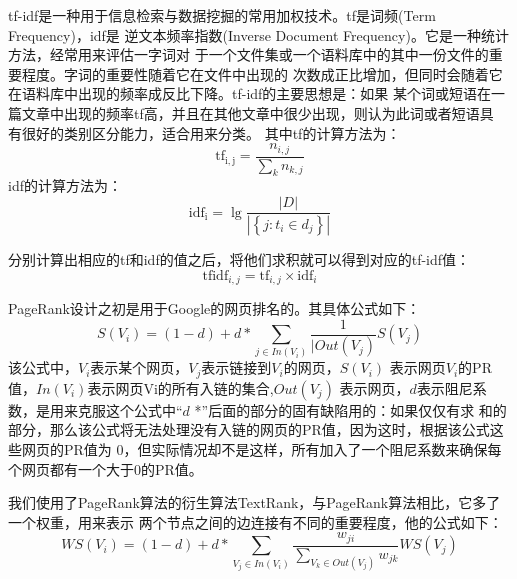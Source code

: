 tf-idf是一种用于信息检索与数据挖掘的常用加权技术。tf是词频(Term Frequency)，idf是
逆文本频率指数(Inverse Document Frequency)。它是一种统计方法，经常用来评估一字词对
于一个文件集或一个语料库中的其中一份文件的重要程度。字词的重要性随着它在文件中出现的
次数成正比增加，但同时会随着它在语料库中出现的频率成反比下降。tf-idf的主要思想是：如果
某个词或短语在一篇文章中出现的频率tf高，并且在其他文章中很少出现，则认为此词或者短语具
有很好的类别区分能力，适合用来分类。
其中tf的计算方法为：
\begin{equation}
    \mathrm{tf}_{\mathrm{i}, \mathrm{j}}=\frac{n_{i, j}}{\sum_{k} n_{k, j}}
\end{equation}
idf的计算方法为：
\begin{equation}
    \mathrm{idf}_{\mathrm{i}}=\lg \frac{|D|}{\left|\left\{j: t_{i} \in d_{j}\right\}\right|}
\end{equation}

分别计算出相应的tf和idf的值之后，将他们求积就可以得到对应的tf-idf值：
\begin{equation}
    \textrm{tfidf} _{i, j}=\textrm{tf}_{i, j} \times \textrm{idf}_{i}
\end{equation}

PageRank设计之初是用于Google的网页排名的。其具体公式如下：
\begin{equation}
    S\left(V_{i}\right)=(1-d)+d * \sum_{j \in I n\left(V_{i}\right)} \frac{1}{\mid O u t\left(V_{j}\right)} S\left(V_{j}\right)
\end{equation}
该公式中，$V_{i}$表示某个网页，$V_{j}$表示链接到$V_{i}$的网页，$S\left(V_{i}\right)$
表示网页$V_{i}$的PR值，$I n\left(V_{i}\right)$表示网页Vi的所有入链的集合,$O u t\left(V_{j}\right)$
表示网页，$d$表示阻尼系数，是用来克服这个公式中“$d$ *”后面的部分的固有缺陷用的：如果仅仅有求
和的部分，那么该公式将无法处理没有入链的网页的PR值，因为这时，根据该公式这些网页的PR值为
0，但实际情况却不是这样，所有加入了一个阻尼系数来确保每个网页都有一个大于0的PR值。

我们使用了PageRank算法的衍生算法TextRank，与PageRank算法相比，它多了一个权重，用来表示
两个节点之间的边连接有不同的重要程度，他的公式如下：
\begin{equation}\label{eq:textrank}
    W S\left(V_{i}\right)=(1-d)+d * \sum_{V_{j} \in I n\left(V_{i}\right)} \frac{w_{j i}}{\sum_{V_{k} \in O u t\left(V_{j}\right)} w_{j k}} W S\left(V_{j}\right)
\end{equation}

